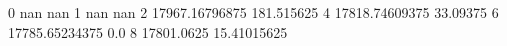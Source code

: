 0 nan nan
1 nan nan
2 17967.16796875 181.515625
4 17818.74609375 33.09375
6 17785.65234375 0.0
8 17801.0625 15.41015625
